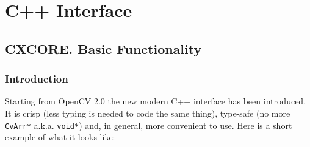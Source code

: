 \chapter{C++ Interface}

\section{CXCORE. Basic Functionality}

\subsection{Introduction}

Starting from OpenCV 2.0 the new modern C++ interface has been introduced.
It is crisp (less typing is needed to code the same thing), type-safe (no more \texttt{CvArr*} a.k.a. \texttt{void*})
and, in general, more convenient to use. Here is a short example of what it looks like:


